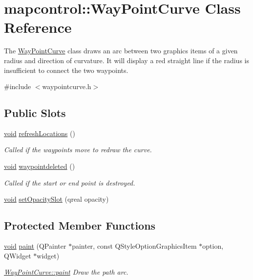 \hypertarget{classmapcontrol_1_1_way_point_curve}{\section{mapcontrol\-:\-:\-Way\-Point\-Curve \-Class \-Reference}
\label{classmapcontrol_1_1_way_point_curve}
}


\-The \hyperlink{classmapcontrol_1_1_way_point_curve}{\-Way\-Point\-Curve} class draws an arc between two graphics items of a given radius and direction of curvature. \-It will display a red straight line if the radius is insufficient to connect the two waypoints.  




{\ttfamily \#include $<$waypointcurve.\-h$>$}

\subsection*{\-Public \-Slots}
\begin{DoxyCompactItemize}
\item 
\hyperlink{group___u_a_v_objects_plugin_ga444cf2ff3f0ecbe028adce838d373f5c}{void} \hyperlink{group___o_p_map_widget_ga5ce80f636cc1414d154b751de3a0f6f3}{refresh\-Locations} ()
\begin{DoxyCompactList}\small\item\em \-Called if the waypoints move to redraw the curve. \end{DoxyCompactList}\item 
\hyperlink{group___u_a_v_objects_plugin_ga444cf2ff3f0ecbe028adce838d373f5c}{void} \hyperlink{group___o_p_map_widget_gad0bb9ce622beb314a984fa559fb1d894}{waypointdeleted} ()
\begin{DoxyCompactList}\small\item\em \-Called if the start or end point is destroyed. \end{DoxyCompactList}\item 
\hyperlink{group___u_a_v_objects_plugin_ga444cf2ff3f0ecbe028adce838d373f5c}{void} \hyperlink{group___o_p_map_widget_ga61d082b265428ef62b08b8faf2fa8ec0}{set\-Opacity\-Slot} (qreal opacity)
\end{DoxyCompactItemize}
\subsection*{\-Protected \-Member \-Functions}
\begin{DoxyCompactItemize}
\item 
\hyperlink{group___u_a_v_objects_plugin_ga444cf2ff3f0ecbe028adce838d373f5c}{void} \hyperlink{group___o_p_map_widget_gaa2b1fdb88cca171d82b5705989370729}{paint} (\-Q\-Painter $\ast$painter, const \-Q\-Style\-Option\-Graphics\-Item $\ast$option, \-Q\-Widget $\ast$widget)
\begin{DoxyCompactList}\small\item\em \hyperlink{group___o_p_map_widget_gaa2b1fdb88cca171d82b5705989370729}{\-Way\-Point\-Curve\-::paint} \-Draw the path arc. \end{DoxyCompactList}\end{DoxyCompactItemize}


